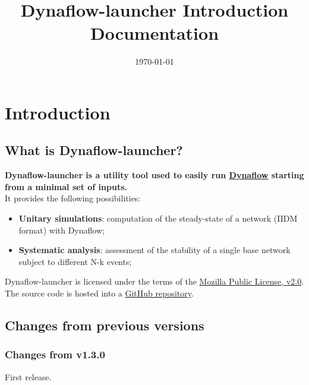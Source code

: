 \documentclass[a4paper, 12pt]{report}
\begin{document}
\title{Dynaflow-launcher Introduction Documentation}
\date\today

\maketitle
\tableofcontents

\chapter{Introduction}

\section{What is Dynaflow-launcher?}

\textbf{Dynaflow-launcher is a utility tool used to easily run \href{https://dynawo.github.io/}{\underline{Dynaflow}}
starting from a minimal set of inputs.} \\

It provides the following possibilities:
\begin{itemize}
  \item \textbf{Unitary simulations}: computation of the steady-state of a network (IIDM format) with Dynaflow;
  \item \textbf{Systematic analysis}: assessment of the stability of a single base network subject to different N-k events;
\end{itemize}

Dynaflow-launcher is licensed under the terms of the \href{http://mozilla.org/MPL/2.0}{\underline{Mozilla Public License, v2.0}}.
The source code is hosted into a \href{https://github.com/dynawo/dynaflow-launcher} {\underline{GitHub repository}}. \\

\section{Changes from previous versions}

\subsection{Changes from v1.3.0}
First release.
\end{document}
